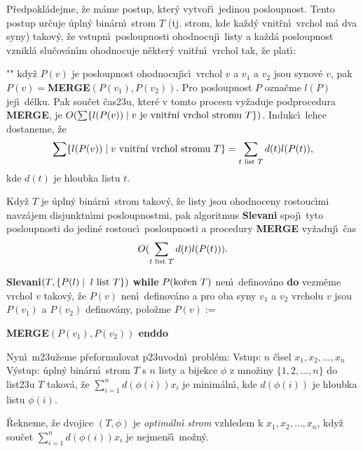 \flushpar P\v redpokl\'adejme, \v ze m\'ame postup, kter\'y vytvo\v r\'\i\ 
jedinou po\-sloupnost. Tento postup ur\v cuje \'upln\'y 
bin\'arn\'\i\ strom $T$ (tj. strom, kde ka\v zd\'y vnit\v rn\'\i\ 
vrchol m\'a dva syny) tako\-v\'y, \v ze vstupn\'\i\ posloupnosti 
ohodnocuj\'\i\ listy a ka\v zd\'a posloupnost vznik\-l\'a slu\v cov\'an\'\i m 
ohodnocuje n\v ekter\'y vnit\v rn\'\i\ vrchol tak, \v ze plat\'\i :
\roster
\item"{}"
kdy\v z $P(v)$ je posloupnost ohodnocuj\'\i c\'\i\ vrchol $v$ 
a $v_1$ a $v_2$ jsou synov\'e $v$, pak 
$P(v)=${\bf MERGE$(P(v_1),P(v_2))$}.
\endroster
Pro posloupnost $P$ ozna\v cme $l(P)$ jej\'\i\ d\'elku. Pak sou\v cet 
\v cas\accent23u, kter\'e v tomto procesu vy\v zaduje 
podprocedura {\bf MERGE},
je $O(\sum \{l(P(v))\mid v\text{\rm \ je vnit\v rn\'\i\ vrchol stromu }
T\})$. Indukc\'\i\ 
lehce dostaneme, \v ze 
$$\sum \{l(P(v))\mid v\text{\rm\ vnit\v rn\'\i\ vrchol stromu }T\}
=\sum_{t\text{\rm\ list }T}d(t)l(P(t)),$$
kde $d(t)$ je hloubka listu $t$.
\medskip

\flushpar Kdy\v z $T$ je \'upln\'y bin\'arn\'\i\ strom takov\'y, \v ze listy
jsou ohodnoceny rostouc\'\i mi navz\'ajem disjunktn\'\i mi 
posloupnostmi, pak algoritmus {\bf Slevani} spoj\'\i\ tyto  
posloupnosti do jedin\'e rostouc\'\i\ posloupnosti a procedury 
{\bf MERGE}  vy\v zaduj\'\i\ \v cas 
$$O(\sum_{t\text{\rm\ list }T}d(t)l(P(t))).$$
\bigskip

{\bf Slevani$(T,\{P(l)\mid\;l\text{\rm \ {list }}T\})$\newline }
{\bf while} $P(\text{\rm ko\v ren }T)$ nen\'\i\ definov\'ano {\bf do}\newline 
vezm\v eme vrchol $v$ takov\'y, \v ze $P(v)$ nen\'\i\ definov\'ano 
a pro oba syny $v_1$ a $v_2$ vrcholu $v$ jsou $P(v_1)$ a $P(v_2)$ 
definov\'any, polo\v zme $P(v):=${\bf MERGE$(P(v_1),P(v_2))$\newline 
enddo
\bigskip

}\flushpar Nyn\'\i\ m\accent23u\v zeme p\v reformulovat p\accent23uvodn\'\i\ 
probl\'em:\newline 
Vstup: $n$ \v c\'\i sel $x_1,x_2,\dots,x_n$\newline 
V\'ystup: \'upln\'y bin\'arn\'\i\ strom $T$ s $n$ listy a bijekce $
\phi$ z 
mno\v ziny $\{1,2,\dots,n\}$ do list\accent23u $T$ takov\'a, \v ze 
$\sum_{i=1}^nd(\phi (i))x_i$ je minim\'aln\'\i , kde $d(\phi (i))$ je hloubka 
listu $\phi (i)$. 
\medskip

\flushpar\v Rekneme, \v ze dvojice $(T,\phi )$ je \emph{optim\'aln\'\i} 
\emph{strom} vzhledem k $x_1,x_2,\dots,x_n$, kdy\v z  
sou\v cet $\sum_{i=1}^nd(\phi (i))x_i$ je nejmen\v s\'\i\ mo\v zn\'y. 
\medskip

